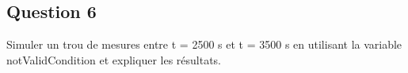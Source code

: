 \documentclass[../CSC_5RO12_TA_TP2.tex]{subfiles}
\begin{document}
\subsection{Question 6}

Simuler un trou de mesures entre t = 2500 s et t = 3500 s en utilisant la variable notValidCondition et expliquer les résultats.
\end{document}
